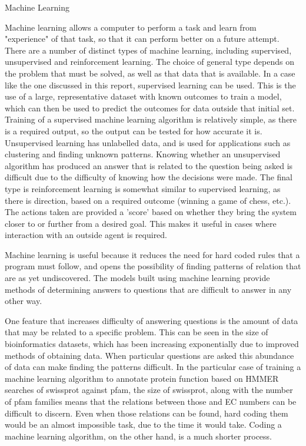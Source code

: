 \documentclass[12pt]{article}
\makeatletter
\renewcommand\subsection{\@startsection{subsection}{4}{\z@}
            {-2.5ex\@plus -1ex \@minus -.25ex}
            {1ex \@plus .25ex}
            {\normalfont\Large\bfseries}}
\makeatother
\begin{document}
		\subsection{Machine Learning}
		
			Machine learning allows a computer to perform a task and learn from "experience" of that task, so that it can perform better on a future attempt.  There are a number of distinct types of machine learning, including supervised, unsupervised and reinforcement learning.  The choice of general type depends on the problem that must be solved, as well as that data that is available.  In a case like the one discussed in this report, supervised learning can be used.  This is the use of a large, representative dataset with known outcomes to train a model, which can then be used to predict the outcomes for data outside that initial set.  Training of a supervised machine learning algorithm is relatively simple, as there is a required output, so the output can be tested for how accurate it is.  Unsupervised learning has unlabelled data, and is used for applications such as clustering and finding unknown patterns.  Knowing whether an unsupervised algorithm has produced an answer that is related to the question being asked is difficult due to the difficulty of knowing how the decisions were made.  The final type is reinforcement learning is somewhat similar to supervised learning, as there is direction, based on a required outcome (winning a game of chess, etc.).  The actions taken are provided a 'score' based on whether they bring the system closer to or further from a desired goal.  This makes it useful in cases where interaction with an outside agent is required.
		
			Machine learning is useful because it reduces the need for hard coded rules that a program must follow, and opens the possibility of finding patterns of relation that are as yet undiscovered.  The models built using machine learning provide methods of determining answers to questions that are difficult to answer in any other way.  
		
			One feature that increases difficulty of answering questions is the amount of data that may be related to a specific problem.  This can be seen in the size of bioinformatics datasets, which has been increasing exponentially due to improved methods of obtaining data.  When particular questions are asked this abundance of data can make finding the patterns difficult.  In the particular case of training a machine learning algorithm to annotate protein function based on HMMER searches of swissprot against pfam, the size of swissprot, along with the number of pfam families means that the relations between those and EC numbers can be difficult to discern.  Even when those relations can be found, hard coding them would be an almost impossible task, due to the time it would take.  Coding a machine learning algorithm, on the other hand, is a much shorter process.
			
\end{document}
